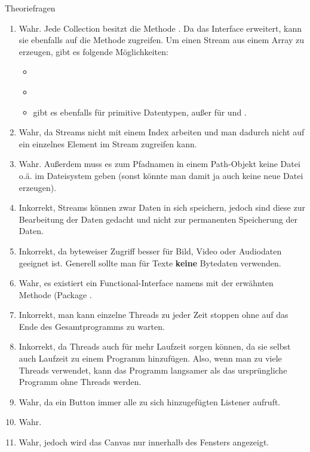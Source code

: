 \documentclass{../tuda-exercise}
\begin{document}
\begin{task}[credit = \stars{0}{3}]{Theoriefragen}
    \begin{solution}
      \begin{enumerate}
        [label = (\Alph*)]
        \item Wahr. Jede Collection besitzt die Methode
        \href{https://docs.oracle.com/en/java/javase/11/docs/api/java.base/java/util/Collection.html#stream()}
        {}. Da das Interface  
        erweitert, kann sie ebenfalls auf die Methode zugreifen. Um einen Stream aus einem Array
        zu erzeugen, gibt es folgende Möglichkeiten:
        \begin{itemize}
          \item \href{https://docs.oracle.com/en/java/javase/11/docs/api/java.base/java/util/Arrays.html#stream(T[])}
          {}
          \item \href{https://docs.oracle.com/en/java/javase/11/docs/api/java.base/java/util/stream/Stream.html#of(T...)}
          {}
          \item {} gibt es ebenfalls für primitive Datentypen, außer für
           und .
        \end{itemize}
        \item Wahr, da Streams nicht mit einem Index arbeiten und man dadurch nicht auf ein
        einzelnes Element im Stream zugreifen kann.
        \item Wahr. Außerdem muss es zum Pfadnamen in einem Path-Objekt keine Datei o.ä. im
        Dateisystem geben (sonst könnte man damit ja auch keine neue Datei erzeugen).
        \item Inkorrekt, Streams können zwar Daten in sich speichern, jedoch sind diese zur
        Bearbeitung der Daten gedacht und nicht zur permanenten Speicherung der Daten.
        \item Inkorrekt, da byteweiser Zugriff besser für Bild, Video oder Audiodaten geeignet
        ist. Generell sollte man für Texte \textbf{keine} Bytedaten verwenden.
        \item Wahr, es existiert ein Functional-Interface namens  mit der
        erwähnten Methode (Package .
        \item Inkorrekt, man kann einzelne Threads zu jeder Zeit stoppen ohne auf das Ende des
        Gesamtprogramms zu warten.
        \item Inkorrekt, da Threads auch für mehr Laufzeit sorgen können, da sie selbst auch
        Laufzeit zu einem Programm hinzufügen. Also, wenn man zu viele Threads verwendet, kann
        das Programm langsamer als das ursprüngliche Programm ohne Threads werden.
        \item Wahr, da ein Button immer alle zu sich hinzugefügten Listener aufruft.
        \item Wahr.
        \item Wahr, jedoch wird das Canvas nur innerhalb des Fensters angezeigt.
      \end{enumerate}


\end{solution}
\end{task}
\end{document}
